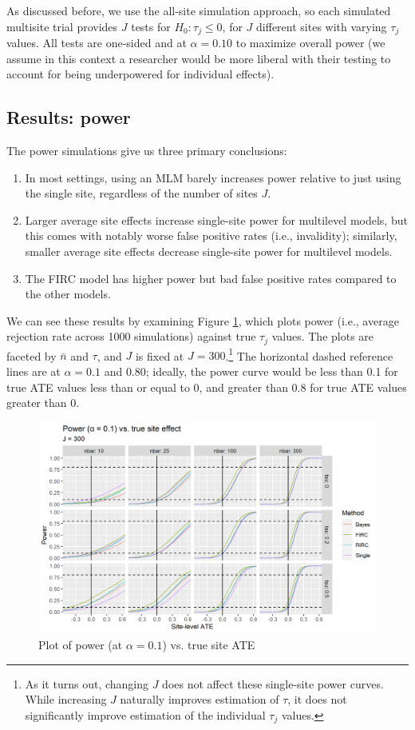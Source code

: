 \documentclass[]{article}
\begin{document}
As discussed before, we use the all-site simulation approach, so each simulated multisite trial provides $J$ tests for $H_0: \tau_j \leq 0$, for $J$ different sites with varying $\tau_j$ values.
All tests are one-sided and at $\alpha=0.10$ to maximize overall power (we assume in this context a researcher would be more liberal with their testing to account for being underpowered for individual effects).

\subsection{Results: power}

The power simulations give us three primary conclusions:
\begin{enumerate}
	\item In most settings, using an MLM barely increases power relative to just using the single site, regardless of the number of sites $J$.
	\item Larger average site effects increase single-site power for multilevel models, but this comes with notably worse false positive rates (i.e., invalidity); similarly, smaller average site effects decrease single-site power for multilevel models.
	\item The FIRC model has higher power but bad false positive rates compared to the other models.
\end{enumerate}

We can see these results by examining Figure \ref{fig:power_plot}, which plots power (i.e., average rejection rate across 1000 simulations) against true $\tau_j$ values.
The plots are faceted by $\bar{n}$ and $\tau$, and $J$ is fixed at $J=300$.\footnote{As it turns out, changing $J$ does not affect these single-site power curves.
While increasing $J$ naturally improves estimation of $\tau$, it does not significantly improve estimation of the individual $\tau_j$ values.}
The horizontal dashed reference lines are at $\alpha = 0.1$ and $0.80$; ideally, the power curve would be less than 0.1 for true ATE values less than or equal to 0, and greater than 0.8 for true ATE values greater than 0.

\begin{figure}[ht]
	\centering
	\includegraphics[width=\textwidth]{power_plot_J300}
	\caption{Plot of power (at $\alpha = 0.1$) vs. true site ATE}
	\label{fig:power_plot}
\end{figure}
\end{document}
